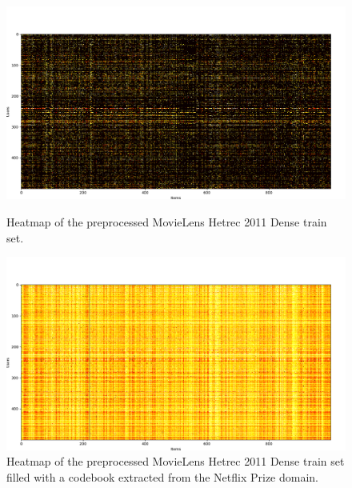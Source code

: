 \begin{figure}[hbt!]
\centering
\includegraphics[width=\textwidth]{pictures/movielens-target}
\caption{Heatmap of the preprocessed MovieLens Hetrec 2011 Dense train set.}
\includegraphics[width=\textwidth]{pictures/movielens-target-filled}
\caption{Heatmap of the preprocessed MovieLens Hetrec 2011 Dense train set filled with a codebook extracted from the Netflix Prize domain.}
\end{figure}


